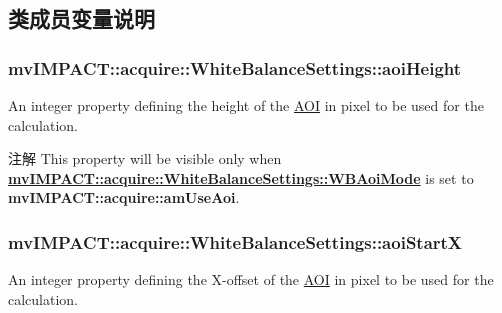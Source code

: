 \subsection{类成员变量说明}
\hypertarget{classmv_i_m_p_a_c_t_1_1acquire_1_1_white_balance_settings_ae0c4fe8b5a258b6b9950d13c9c3c7133}{
\subsubsection[{aoi\+Height}]{ mv\+I\+M\+P\+A\+C\+T\+::acquire\+::\+White\+Balance\+Settings\+::aoi\+Height}}\label{classmv_i_m_p_a_c_t_1_1acquire_1_1_white_balance_settings_ae0c4fe8b5a258b6b9950d13c9c3c7133}


An integer property defining the height of the \hyperlink{struct_a_o_i}{A\+O\+I} in pixel to be used for the calculation. 

\begin{DoxyNote}{注解}
This property will be visible only when {\bfseries \hyperlink{classmv_i_m_p_a_c_t_1_1acquire_1_1_white_balance_settings_a60af41e60e38c698d39b36ee745b2648}{mv\+I\+M\+P\+A\+C\+T\+::acquire\+::\+White\+Balance\+Settings\+::\+W\+B\+Aoi\+Mode}} is set to {\bfseries mv\+I\+M\+P\+A\+C\+T\+::acquire\+::am\+Use\+Aoi}. 
\end{DoxyNote}
\hypertarget{classmv_i_m_p_a_c_t_1_1acquire_1_1_white_balance_settings_a8fefb19aac00ba084b3330dedcddbe1c}{
\subsubsection[{aoi\+Start\+X}]{ mv\+I\+M\+P\+A\+C\+T\+::acquire\+::\+White\+Balance\+Settings\+::aoi\+Start\+X}}\label{classmv_i_m_p_a_c_t_1_1acquire_1_1_white_balance_settings_a8fefb19aac00ba084b3330dedcddbe1c}


An integer property defining the X-\/offset of the \hyperlink{struct_a_o_i}{A\+O\+I} in pixel to be used for the calculation. 


